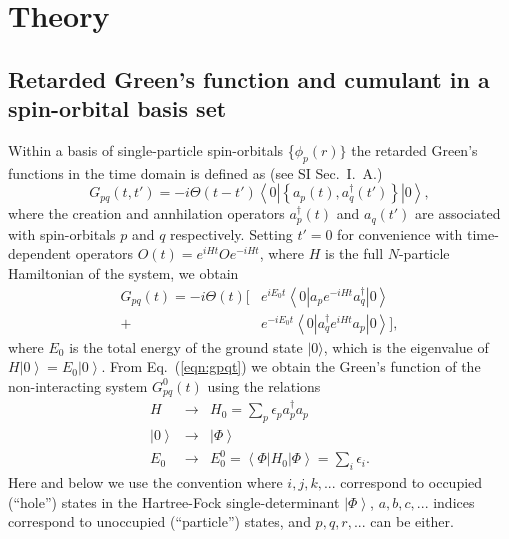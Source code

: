 \documentclass[aps,prb,twocolumn,groupaddress,floatfix]{revtex4}
\begin{document}
\section{Theory}
\label{sec:theo}

\subsection{Retarded Green's function and cumulant in a spin-orbital basis set}
\label{sec:gfcum}

Within a basis of single-particle spin-orbitals \{$\phi_p(r)\}$
the retarded Green's functions in the time domain is
defined as (see SI Sec.\ I.\ A.)
\begin{equation}
\label{eqn:gpq}
G_{pq}(t,t') =
-i \Theta(t-t')
\left<0\left| \left\{a_p(t), a_q^\dagger(t') \right\} \right| 0 \right>,
\end{equation}
where the creation and annhilation operators $a_p^\dagger(t)$ and $a_q(t')$ are
associated with spin-orbitals $p$ and $q$ respectively.
Setting $t'=0$ for convenience with time-dependent operators 
$O(t) = e^{iHt}Oe^{-iHt}$, where $H$ is the
full $N$-particle Hamiltonian of the system, we obtain
\begin{equation}
\label{eqn:gpqt}
\begin{split}
G_{pq}(t) =
-i \Theta(t)[ &
  e^{iE_0t} \left<0\left| a_p e^{-iHt} a_q^\dagger \right| 0 \right>  \\
+ & e^{-iE_0t}\left<0\left| a_q^\dagger e^{iHt} a_p \right| 0 \right> ],
\end{split}
\end{equation}
where $E_0$ is the total energy of the ground state $|0\rangle$,
which is the eigenvalue of $H \left| 0 \right> = E_0 \left| 0 \right>$.
From Eq.\ (\ref{eqn:gpqt}) we obtain the Green's function
of the non-interacting system $G^0_{pq}(t)$ using the relations
\begin{eqnarray}
H   &\rightarrow& H_0 = \sum_p\epsilon_p a_p^{\dagger}a_p \nonumber \\
\left| 0 \right> &\rightarrow& \left| \Phi \right> \nonumber \\
E_0 &\rightarrow& E^0_0 =
\left< \Phi \left| H_0 \right| \Phi \right> = \sum_i \epsilon_i.
\end{eqnarray}
Here and below we use the convention where $i, j, k, ...$
correspond to occupied (``hole'') states in the Hartree-Fock single-determinant $\left| \Phi \right>$, $a, b, c, ...$ indices correspond to unoccupied (``particle'') states, and $p, q, r, ...$ can be either.
\end{document}
